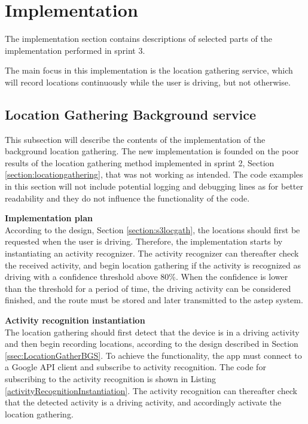 \section{Implementation}
The implementation section contains descriptions of selected parts of the implementation performed in sprint 3.

The main focus in this implementation is the location gathering service, which will record locations continuously while the user is driving, but not otherwise. 

\subsection{Location Gathering Background service}
This subsection will describe the contents of the implementation of the background location gathering.
The new implementation is founded on the poor results of the location gathering method implemented in sprint 2, Section \ref{section:locationgathering}, that was not working as intended.
The code examples in this section will not include potential logging and debugging lines as for better readability and they do not influence the functionality of the code.

\textbf{Implementation plan}\\
According to the design, Section \ref{section:s3locgath}, the locations should first be requested when the user is driving.
Therefore, the implementation starts by instantiating an activity recognizer.
The activity recognizer can thereafter check the received activity, and begin location gathering if the activity is recognized as driving with a confidence threshold above 80\%.
When the confidence is lower than the threshold for a period of time, the driving activity can be considered finished, and the route must be stored and later transmitted to the \gls{astep} system.


\textbf{Activity recognition instantiation}\\
The location gathering should first detect that the device is in a driving activity and then begin recording locations, according to the design described in Section \ref{ssec:LocationGatherBGS}.
To achieve the functionality, the app must connect to a Google API client and subscribe to activity recognition.
The code for subscribing to the activity recognition is shown in Listing \ref{activityRecognitionInstantiation}.
The activity recognition can thereafter check that the detected activity is a driving activity, and accordingly activate the location gathering.

